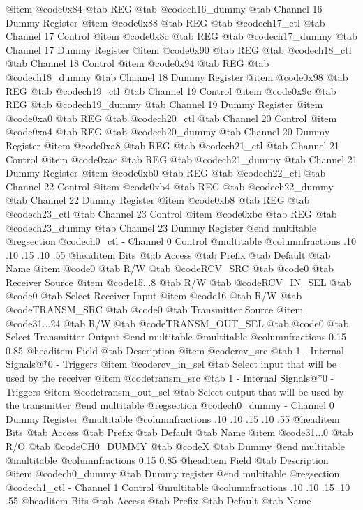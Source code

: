 @item @code{0x84} @tab
REG @tab
@code{ch16_dummy} @tab
Channel 16 Dummy Register
@item @code{0x88} @tab
REG @tab
@code{ch17_ctl} @tab
Channel 17 Control
@item @code{0x8c} @tab
REG @tab
@code{ch17_dummy} @tab
Channel 17 Dummy Register
@item @code{0x90} @tab
REG @tab
@code{ch18_ctl} @tab
Channel 18 Control
@item @code{0x94} @tab
REG @tab
@code{ch18_dummy} @tab
Channel 18 Dummy Register
@item @code{0x98} @tab
REG @tab
@code{ch19_ctl} @tab
Channel 19 Control
@item @code{0x9c} @tab
REG @tab
@code{ch19_dummy} @tab
Channel 19 Dummy Register
@item @code{0xa0} @tab
REG @tab
@code{ch20_ctl} @tab
Channel 20 Control
@item @code{0xa4} @tab
REG @tab
@code{ch20_dummy} @tab
Channel 20 Dummy Register
@item @code{0xa8} @tab
REG @tab
@code{ch21_ctl} @tab
Channel 21 Control
@item @code{0xac} @tab
REG @tab
@code{ch21_dummy} @tab
Channel 21 Dummy Register
@item @code{0xb0} @tab
REG @tab
@code{ch22_ctl} @tab
Channel 22 Control
@item @code{0xb4} @tab
REG @tab
@code{ch22_dummy} @tab
Channel 22 Dummy Register
@item @code{0xb8} @tab
REG @tab
@code{ch23_ctl} @tab
Channel 23 Control
@item @code{0xbc} @tab
REG @tab
@code{ch23_dummy} @tab
Channel 23 Dummy Register
@end multitable 
@regsection @code{ch0_ctl} - Channel 0 Control
@multitable @columnfractions .10 .10 .15 .10 .55
@headitem Bits @tab Access @tab Prefix @tab Default @tab Name
@item @code{0}
@tab R/W @tab
@code{RCV_SRC}
@tab @code{0} @tab 
Receiver Source
@item @code{15...8}
@tab R/W @tab
@code{RCV_IN_SEL}
@tab @code{0} @tab 
Select Receiver Input
@item @code{16}
@tab R/W @tab
@code{TRANSM_SRC}
@tab @code{0} @tab 
Transmitter Source
@item @code{31...24}
@tab R/W @tab
@code{TRANSM_OUT_SEL}
@tab @code{0} @tab 
Select Transmitter Output
@end multitable
@multitable @columnfractions 0.15 0.85
@headitem Field @tab Description
@item @code{rcv_src} @tab 1 - Internal Signals@*0 - Triggers
@item @code{rcv_in_sel} @tab Select input that will be used by the receiver
@item @code{transm_src} @tab 1 - Internal Signals@*0 - Triggers
@item @code{transm_out_sel} @tab Select output that will be used by the transmitter
@end multitable
@regsection @code{ch0_dummy} - Channel 0 Dummy Register
@multitable @columnfractions .10 .10 .15 .10 .55
@headitem Bits @tab Access @tab Prefix @tab Default @tab Name
@item @code{31...0}
@tab R/O @tab
@code{CH0_DUMMY}
@tab @code{X} @tab 
Dummy
@end multitable
@multitable @columnfractions 0.15 0.85
@headitem Field @tab Description
@item @code{ch0_dummy} @tab Dummy register
@end multitable
@regsection @code{ch1_ctl} - Channel 1 Control
@multitable @columnfractions .10 .10 .15 .10 .55
@headitem Bits @tab Access @tab Prefix @tab Default @tab Name
